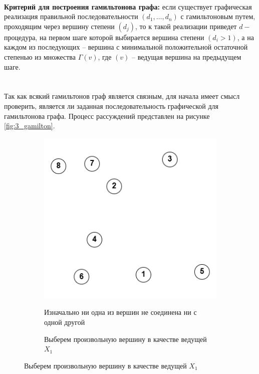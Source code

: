 \documentclass{article}
\begin{document}
\begin{enumerate}
\\
\textbf{Критерий для построения гамильтонова графа:} если существует графическая реализация правильной последовательности $(d_1, \dots, d_n)$ с гамильтоновым путем, проходящим через вершину степени $(d_j)$, то к такой реализации приведет $d-$процедура, на первом шаге которой выбирается вершина степени $(d_i > 1)$, а на каждом из последующих -- вершина с минимальной положительной остаточной степенью из множества $\Gamma(v)$, где $(v)$ -- ведущая вершина на предыдущем шаге.\\
\\
\\
Так как всякий гамильтонов граф является связным, для начала имеет смысл проверить, является ли заданная последовательность графической для гамильтонова графа. Процесс рассуждений представлен на рисунке \ref{fig:3_gamilton}.
\begin{figure}
     \centering
     \begin{subfigure}[b]{0.2\textwidth}
         \centering
         \caption*{\footnotesize{Изначально ни одна из вершин не соединена ни с одной другой}}
         \includegraphics[width=\textwidth]{attachments/3/1.png}
         \label{fig:3_0}
     \end{subfigure}
     \hfill
     \begin{subfigure}[b]{0.2\textwidth}
         \centering
         \caption*{\footnotesize{Выберем произвольную вершину в качестве ведущей \quad\textemdash\quad $X_1$}}

\end{subfigure}
\end{figure}
\end{enumerate}
\end{document}
